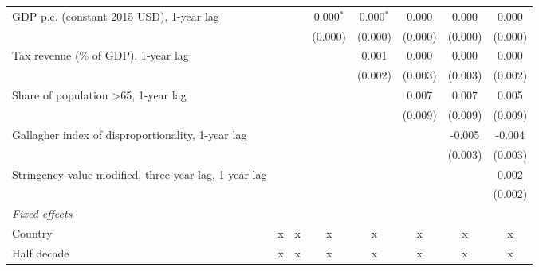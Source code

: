 \begin{table}[htbp]
\begin{tabular}{lccccccc}
      GDP p.c. (constant 2015 USD), 1-year lag                       &                &                & 0.000$^{*}$    & 0.000$^{*}$   & 0.000         & 0.000         & 0.000\\   
                                                                     &                &                & (0.000)        & (0.000)       & (0.000)       & (0.000)       & (0.000)\\   
      Tax revenue (\% of GDP), 1-year lag                            &                &                &                & 0.001         & 0.000         & 0.000         & 0.000\\   
                                                                     &                &                &                & (0.002)       & (0.003)       & (0.003)       & (0.002)\\   
      Share of population >65, 1-year lag                            &                &                &                &               & 0.007         & 0.007         & 0.005\\   
                                                                     &                &                &                &               & (0.009)       & (0.009)       & (0.009)\\   
      Gallagher index of disproportionality, 1-year lag              &                &                &                &               &               & -0.005        & -0.004\\   
                                                                     &                &                &                &               &               & (0.003)       & (0.003)\\   
      Stringency value modified, three-year lag, 1-year lag          &                &                &                &               &               &               & 0.002\\   
                                                                     &                &                &                &               &               &               & (0.002)\\   
      \emph{Fixed effects}\\
      Country                                                        & x              & x              & x              & x             & x             & x             & x\\  
      Half decade                                                    & x              & x              & x              & x             & x             & x             & x\\  

\end{tabular}
\end{table}
